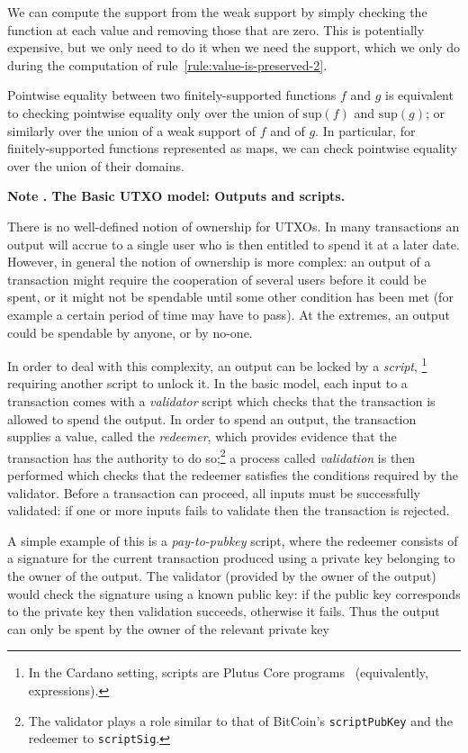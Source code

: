 \documentclass[a4paper]{article}
\newcounter{note}
\newcommand{\note}[1]{
  \bigskip
  \refstepcounter{note}
  \noindent\textbf{Note \thenote. #1}
}
\renewcommand{\i}{\textit}  %
\newcommand{\support}{\ensuremath{\mathrm{sup}}}
\begin{document}
We can compute the support from the weak support by simply checking the function
at each value and removing those that are zero. This is potentially expensive,
but we only need to do it when we need the support, which we only do during the
computation of rule~\ref{rule:value-is-preserved-2}.

Pointwise equality between two finitely-supported functions $f$ and $g$ is
equivalent to checking pointwise equality only over the union of $\support(f)$
and $\support(g)$; or similarly over the union of a weak support of $f$ and of
$g$. In particular, for finitely-supported functions represented as maps, we can
check pointwise equality over the union of their domains.

\note{The Basic UTXO model: Outputs and scripts.}
\label{note:basic-utxo}
There is no well-defined notion of ownership for UTXOs.  In many
transactions an output will accrue to a single user who is then
entitled to spend it at a later date.  However, in general the notion
of ownership is more complex: an output of a transaction might require
the cooperation of several users before it could be spent, or it might
not be spendable until some other condition has been met (for example
a certain period of time may have to pass).  At the extremes, an
output could be spendable by anyone, or by no-one.

In order to deal with this complexity, an output can be locked by a
\textit{script},%
\footnote{In the Cardano setting, scripts are Plutus Core
  programs~\citep{Plutus-Core-spec} (equivalently, expressions).  }
requiring another script to unlock it.  In the basic model, each input
to a transaction comes with a \i{validator} script which checks that
the transaction is allowed to spend the output. In order to spend an
output, the transaction supplies a value, called the
\i{redeemer}, which provides evidence that the transaction has the
authority to do so;\footnote{The validator plays a role similar to
  that of BitCoin's \texttt{scriptPubKey} and the redeemer to
  \texttt{scriptSig}.  } a process called \i{validation} is then
performed which checks that the redeemer satisfies the conditions
required by the validator. Before a transaction can proceed, all inputs
must be successfully validated: if one or more inputs fails to
validate then the transaction is rejected.

A simple example of this is a \i{pay-to-pubkey} script, where the
redeemer consists of a signature for the current transaction produced
using a private key belonging to the owner of the output.  The
validator (provided by the owner of the output) would check the
signature using a known public key: if the public key corresponds to
the private key then validation succeeds, otherwise it fails.  Thus
the output can only be spent by the owner of the relevant private key
\end{document}
